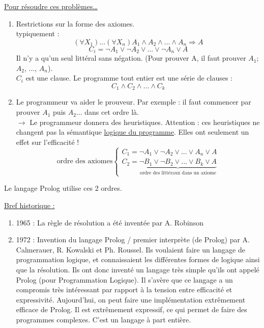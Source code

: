\underline{Pour résoudre ces problèmes…}
\begin{enumerate}
	\item Restrictions sur la forme des axiomes.\\
	typiquement : 
	\begin{equation}
		(\forall X_{1}) ... (\forall X_{n}) A_{1} \wedge A_{2} \wedge ... \wedge A_{n} \Rightarrow A
	\end{equation}
	\begin{equation}
		C_{i} = \neg A_{1} \vee \neg A_{2} \vee ... \vee \neg A_{n} \vee A
	\end{equation}
	Il n’y a qu’un seul littéral sans négation. (Pour prouver A, il faut prouver $A_{1}$; $A_{2}$, ..., $A_{n}$).\\
	$C_{i}$ est une clause. Le programme tout entier est une série de clauses :
	\begin{equation}
		C_{1} \wedge C_{2} \wedge ... \wedge C_{k}
	\end{equation}
	\item Le programmeur va aider le prouveur.
	Par exemple : il faut commencer par prouver $A_{1}$ puis $A_{2}$... dans cet ordre là.\\
	$\rightarrow$ Le programmeur donnera des heuristiques. Attention : ces heuristiques ne changent pas la sémantique \underline{logique du programme}. Elles ont seulement un effet sur l’efficacité !
	\begin{equation}
		\text{ordre des axiomes}\left \{
		\begin{array}{l}
		C_{1} = \neg A_{1} \vee \neg A_{2} \vee ... \vee A_{n} \vee A \\
	
		C_{2} = \underbrace{\neg B_{1} \vee \neg B_{2} \vee ... \vee B_{k} \vee A}_{\text{ordre des littéraux dans un axiome}}
		\end{array}
		\right.
	\end{equation}
	
\end{enumerate}

Le langage Prolog utilise ces 2 ordres.

\underline{Bref historique :}
\begin{enumerate}
	\item 1965 : 	La règle de résolution a été inventée par A. Robinson
	\item 1972 :	Invention du langage Prolog / premier interprète (de Prolog) par A. Calmerauer, R. Kowalski et Ph. Roussel. 
Ils voulaient faire un langage de programmation logique, et connaissaient les différentes formes de logique ainsi que la résolution. Ils ont donc inventé un langage très simple qu'ils ont appelé Prolog (pour Programmation Logique).  Il s'avère que ce langage a un compromis très intéressant par rapport à la tension entre efficacité et expressivité.
Aujourd'hui, on peut faire une implémentation extrêmement efficace de Prolog. Il est extrêmement expressif, ce qui permet de faire des programmes complexes. C’est un langage à part entière.
\end{enumerate}

